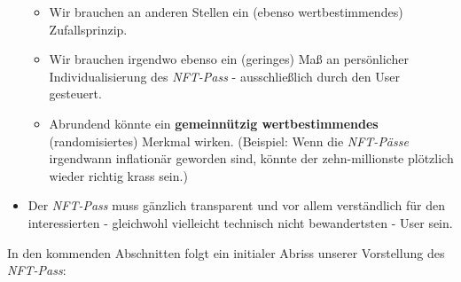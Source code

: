 \begin{itemize}
\begin{itemize}
    \item Wir brauchen an anderen Stellen ein (ebenso wertbestimmendes) Zufallsprinzip.
    \item Wir brauchen irgendwo ebenso ein (geringes) Maß an persönlicher Individua\-lisierung des \textit{NFT-Pass} - ausschließlich durch den User gesteuert.
    \item Abrundend könnte ein \textbf{gemeinnützig wertbestimmendes} (randomisiertes) Merkmal wirken. (Beispiel: Wenn die \textit{NFT-Pässe} irgendwann inflationär geworden sind, könnte der zehn-millionste plötzlich wieder richtig krass sein.)
  \end{itemize}
  \item Der \textit{NFT-Pass} muss gänzlich transparent und vor allem verständlich für den interessierten - gleichwohl vielleicht technisch nicht bewandertsten - User sein.
\end{itemize}

\vspace{0.3cm}

In den kommenden Abschnitten folgt ein initialer Abriss unserer Vorstellung des \textit{NFT-Pass}:

\vspace{0.3cm}
